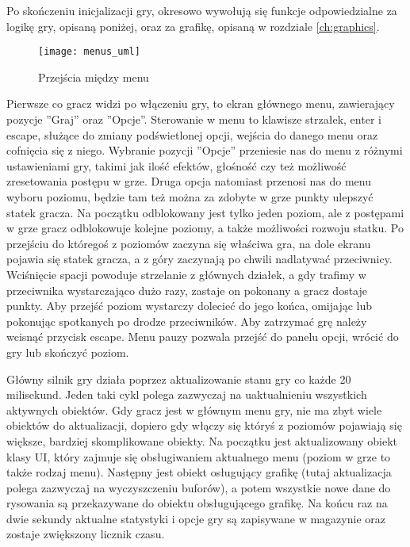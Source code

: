 Po skończeniu inicjalizacji gry, okresowo wywołują się funkcje odpowiedzialne za logikę gry, opisaną poniżej, oraz za grafikę, opisaną w rozdziale \ref{ch:graphics}.
\newpage

\smallskip

\begin{wrapfigure}{r}{0.39\textwidth}
	\centering
	\noindent\texttt{[image: menus\_uml]}
	\caption{Przej\'scia między menu}
\end{wrapfigure}
Pierwsze co gracz widzi po włączeniu gry, to ekran głównego menu, zawierający pozycje ''Graj'' oraz ''Opcje''. Sterowanie w menu to klawisze strzałek, enter i escape, służące do zmiany pod\'swietlonej opcji, wej\'scia do danego menu oraz cofnięcia się z niego. Wybranie pozycji ''Opcje'' przeniesie nas do menu z różnymi ustawieniami gry, takimi jak ilo\'sć efektów, gło\'sno\'sć czy też możliwo\'sć zresetowania postępu w grze. Druga opcja natomiast przenosi nas do menu wyboru poziomu, będzie tam też można za zdobyte w grze punkty ulepszyć statek gracza. Na początku odblokowany jest tylko jeden poziom, ale z postępami w grze gracz odblokowuje kolejne poziomy, a także możliwo\'sci rozwoju statku. Po przej\'sciu do którego\'s z poziomów zaczyna się wła\'sciwa gra, na dole ekranu pojawia się statek gracza, a z góry zaczynają po chwili nadlatywać przeciwnicy. Wci\'snięcie spacji powoduje strzelanie z głównych działek, a gdy trafimy w przeciwnika wystarczająco dużo razy, zastaje on pokonany a gracz dostaje punkty. Aby przej\'sć poziom wystarczy dolecieć do jego końca, omijając lub pokonując spotkanych po drodze przeciwników. Aby zatrzymać grę należy wcisnąć przycisk escape. Menu pauzy pozwala przej\'sć do panelu opcji, wrócić do gry lub skończyć poziom.\bigskip

\smallskip

Główny silnik gry działa poprzez aktualizowanie stanu gry co każde 20 milisekund. Jeden taki cykl polega zazwyczaj na uaktualnieniu wszystkich aktywnych obiektów. Gdy gracz jest w głównym menu gry, nie ma zbyt wiele obiektów do aktualizacji, dopiero gdy włączy się który\'s z poziomów pojawiają się większe, bardziej skomplikowane obiekty. Na początku jest aktualizowany obiekt klasy UI, który zajmuje się obsługiwaniem aktualnego menu (poziom w grze to także rodzaj menu). Następny jest obiekt osługujący grafikę (tutaj aktualizacja polega zazwyczaj na wyczyszczeniu buforów), a potem wszystkie nowe dane do rysowania są przekazywane do obiektu obsługującego grafikę. Na końcu raz na dwie sekundy aktualne statystyki i opcje gry są zapisywane w magazynie oraz zostaje zwiększony licznik czasu.

